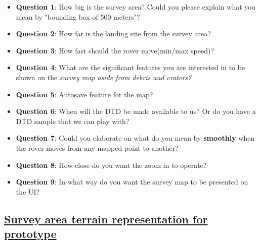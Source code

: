 \documentclass[11pt, a4paper]{article}
\begin{document}
\begin{itemize}

\item[] \textbf{Question 1}: How big is the survey area? Could you please explain what you mean by "bounding box of 500 meters"?

\item[] \textbf{Question 2}: How far is the landing site from the survey area?

\item[] \textbf{Question 3}: How fast should the rover move(min/max speed)?

\item[] \textbf{Question 4}: What are the significant features you are interested in to be shown on the \em{survey map} aside from debris and craters?

\item[] \textbf{Question 5}: Autosave feature for the map?

\item[] \textbf{Question 6}: When will the DTD be made available to us? Or do you have a DTD sample that we can play with?

\item[] \textbf{Question 7}: Could you elaborate on what do you mean by \textbf{smoothly} when the rover moves from any mapped point to another?

\item[] \textbf{Question 8}: How close do you want the zoom in to operate?

\item[] \textbf{Question 9}: In what way do you want the survey map to be presented on the UI?

\end{itemize}

\subsection{\underline{Survey area terrain representation for prototype}}
\end{document}

